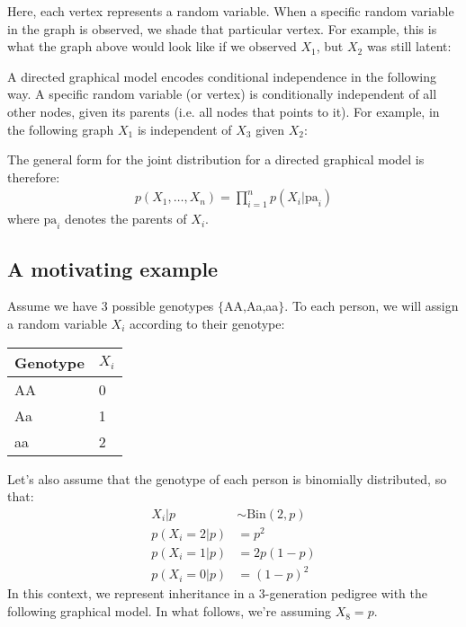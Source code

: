 \documentclass[12pt]{report}
\begin{document}
Here, each vertex represents a random variable. When a specific random
variable in the graph is observed, we shade that particular
vertex. For example, this is what the graph above would look like if
we observed $X_1$, but $X_2$ was still latent:

\begin{center}
\end{center}

A directed graphical model encodes conditional independence in the
following way. A specific random variable (or vertex) is conditionally
independent of all other nodes, given its parents (i.e. all nodes that
points to it). For example, in the following graph $X_1$ is
independent of $X_3$ given $X_2$:

\begin{center}
\end{center}
The general form for the joint distribution for a directed graphical
model is therefore:
\begin{align}
p(X_1,\ldots,X_n) = \prod_{i=1}^n p(X_i |\text{pa}_i) \label{eq:gm_prob}
\end{align}
where $\text{pa}_i$ denotes the parents of $X_i$.
\subsection{A motivating example}
Assume we have 3 possible genotypes $\{$AA,Aa,aa$\}$. To each person, we will assign a
random variable $X_i$ according to their genotype:
\begin{center}
\begin{tabular}{l|l }
  Genotype & $X_i$ \\
  \hline
  AA & 0 \\
  Aa & 1 \\
  aa & 2 
\end{tabular}
\end{center}
Let's also assume that the genotype of each person is binomially
distributed, so that:
\begin{align*}
X_i|p &\sim \text{Bin}(2,p) \\
p(X_i=2|p) &= p^2 \\
p(X_i=1|p) &= 2p(1-p) \\
p(X_i=0|p) &= (1-p)^2
\end{align*}
In this context, we represent inheritance in a 3-generation
pedigree with the following graphical model. In what follows, we're
assuming $X_8 = p$.
\end{document}

